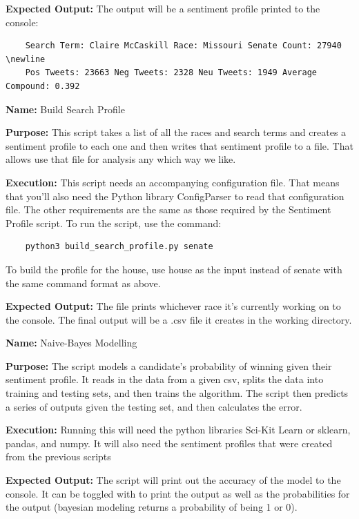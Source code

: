\documentclass[11pt, twoside, reqno]{book}
\begin{document}
\begin{appendices}
\textbf{Expected Output:} The output will be a sentiment profile printed to the console:
\begin{verbatim}
	Search Term: Claire McCaskill Race: Missouri Senate Count: 27940 \newline 
	Pos Tweets: 23663 Neg Tweets: 2328 Neu Tweets: 1949 Average Compound: 0.392
\end{verbatim}



\textbf{Name:} Build Search Profile

\textbf{Purpose:} This script takes a list of all the races and search terms and creates a sentiment profile to each one and then writes that sentiment profile to a file. That allows use that file for analysis any which way we like. 

\textbf{Execution:} This script needs an accompanying configuration file. That means that you'll also need the Python library ConfigParser to read that configuration file. The other requirements are the same as those required by the Sentiment Profile script. To run the script, use the command:
\begin{verbatim}
	python3 build_search_profile.py senate
\end{verbatim}
To build the profile for the house, use house as the input instead of senate with the same command format as above. 

\textbf{Expected Output:} The file prints whichever race it's currently working on to the console. The final output will be a .csv file it creates in the working directory. 



\textbf{Name:} Naive-Bayes Modelling

\textbf{Purpose:} The script models a candidate's probability of winning given their sentiment profile. It reads in the data from a given csv, splits the data into training and testing sets, and then trains the algorithm. The script then predicts a series of outputs given the testing set, and then calculates the error. 

\textbf{Execution:} Running this will need the python libraries Sci-Kit Learn or sklearn, pandas, and numpy. It will also need the sentiment profiles that were created from the previous scripts

\textbf{Expected Output:} The script will print out the accuracy of the model to the console. It can be toggled with to print the output as well as the probabilities for the output (bayesian modeling returns a probability of being 1 or 0). 




\end{appendices}




\end{document}
